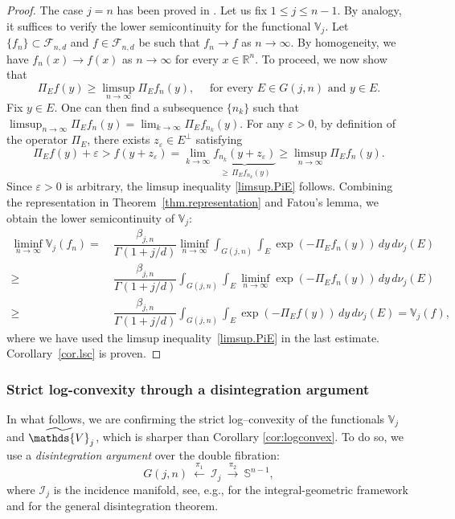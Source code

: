 \documentclass[11pt]{article}
\theoremstyle{definition}
\numberwithin{equation}{section}
\newcommand{\R}{\mathbb{R}}
\newcommand{\Sph}{\mathbb{S}}        %
\newcommand{\cF}{\mathcal{F}}
\newcommand{\Gr}[2]{G(#1,#2)}        %
\newcommand{\opV}{\mathds{V}}       %
\begin{document}
\begin{proof}
The case $j = n$ has been proved in \cite{La_2015}.
Let us fix $1 \leq j \leq n - 1$.
By analogy, it suffices to verify the lower semicontinuity for the functional $\opV_j$.
Let $\{ f_n \} \subset \cF_{n, d}$ and $f \in \cF_{n, d}$ be such that $f_n \to f$ as $n \to \infty$.
By homogeneity, we have $f_n(x) \to f(x)$ as $n \to \infty$ for every $x \in \R^n$.
To proceed, we now show that
\begin{equation}\label{limsup.PiE}
    \Pi_E f(y) \geq \limsup_{n \to \infty} \Pi_E f_n(y),  \quad \text{ for every } E \in \Gr{j}{n} \text{ and } y \in E.
\end{equation}
Fix $y \in E$.
One can then find a subsequence $\{ n_k \}$ such that  $\textstyle\limsup_{n \to \infty} \Pi_E f_n(y) = \textstyle\lim_{k \to \infty} \Pi_E f_{n_k}(y)$.
For any $\varepsilon > 0$, by definition of the operator $\Pi_E$, there exists $z_\varepsilon \in E^\perp$ satisfying
\[
    \Pi_E f(y) + \varepsilon > f(y + z_\varepsilon) = \lim_{k \to \infty} \underbrace{f_{n_k}(y + z_\varepsilon)}_{\, \geq \, \Pi_E f_{n_k}(y)} \geq  \limsup_{n \to \infty} \Pi_E f_n(y).
\]
Since $\varepsilon > 0$ is arbitrary, the limsup inequality \eqref{limsup.PiE} follows.
Combining the representation in Theorem~\ref{thm.representation} and Fatou's lemma, we obtain the lower semicontinuity of $\opV_j$:
\begin{align*}
    \liminf_{n \to \infty} \opV_j(f_n)  = & ~ \dfrac{\beta_{j, n}}{\Gamma(1 + j/d)} \liminf_{n \to \infty} \int_{\Gr{j}{n}}\int_E \exp(- \Pi_E f_n(y)) \, dy \, d\nu_j(E) \\
    \geq & ~ \dfrac{\beta_{j, n}}{\Gamma(1 + j/d)}  \int_{\Gr{j}{n}}\int_E \liminf_{n \to \infty} \exp(- \Pi_E f_n(y)) \, dy \, d\nu_j(E) \\
    \geq & ~ 
    \dfrac{\beta_{j, n}}{\Gamma(1 + j/d)}  \int_{\Gr{j}{n}}\int_E \exp(- \Pi_E f(y)) \, dy \, d\nu_j(E) = \opV_j(f),
\end{align*}
where we have used the limsup inequality~\eqref{limsup.PiE} in the last estimate. 
Corollary~\ref{cor.lsc} is proven.
\end{proof}

\subsubsection*{Strict log-convexity through a disintegration argument}
In what follows, we are confirming the strict log--convexity of the functionals $\opV_j$ and $\widetilde \opV_j$, which is sharper than Corollary \ref{cor:logconvex}.
To do so, we use a \textit{disintegration argument} over the double fibration:
\[
G(j,n)\ \xleftarrow{\ \pi_1\ }\ \mathcal I_j\ \xrightarrow{\ \pi_2\ }\ \Sph^{n-1},
\]
where $\mathcal I_j$ is the incidence manifold, see, e.g., \cite[Chapters ~7, 13]{SW_2008} for the integral-geometric framework and \cite[Chapter~10]{Bogachev_2007} for the general disintegration theorem.
\end{document}
